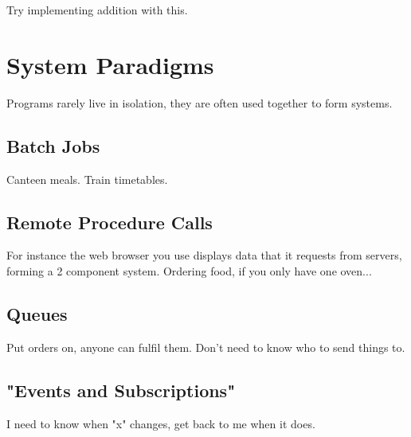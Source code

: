\documentclass{article}
\begin{document}
Try implementing addition with this.

\section{System Paradigms}
Programs rarely live in isolation, they are often used together to form systems.
\subsection{Batch Jobs}
Canteen meals.
Train timetables.
\subsection{Remote Procedure Calls}
For instance the web browser you use displays data that it requests from servers, forming a 2 component system.
Ordering food, if you only have one oven...
\subsection{Queues}
Put orders on, anyone can fulfil them.
Don't need to know who to send things to.
\subsection{"Events and Subscriptions"}
I need to know when "x" changes, get back to me when it does.
\end{document}
